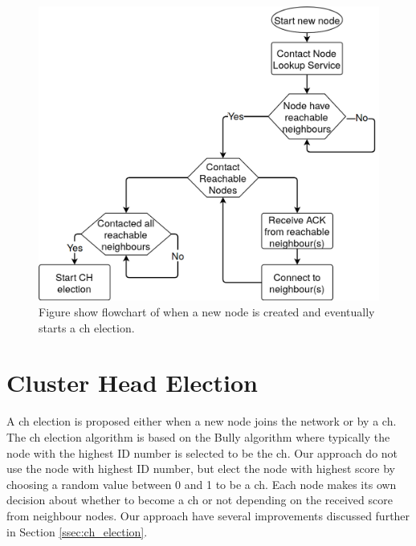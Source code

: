 \documentclass[USenglish]{uit-thesis}
\begin{document}
\begin{figure}
\centering
\includegraphics[scale=0.28]{newNodeChart2.png}
\caption{Figure show flowchart of when a new node is created and eventually starts a \gls{ch} election.}
\label{fig:newNodeChart2}
\end{figure}



\section{Cluster Head Election} \label{imp:ch_election}


A \gls{ch} election is proposed either when a new node joins the network or by a \gls{ch}. 
The \gls{ch} election algorithm is based on the Bully algorithm \cite{bully} where typically the node with the highest ID number is selected to be the \gls{ch}. Our approach do not use the node with highest ID number, but elect the node with highest score by choosing a random value between $0$ and 1 to be a \gls{ch}. Each node makes its own decision about whether to become a \gls{ch} or not depending on the received score from neighbour nodes.
Our approach have several improvements discussed further in Section \ref{ssec:ch_election}. 
\end{document}
